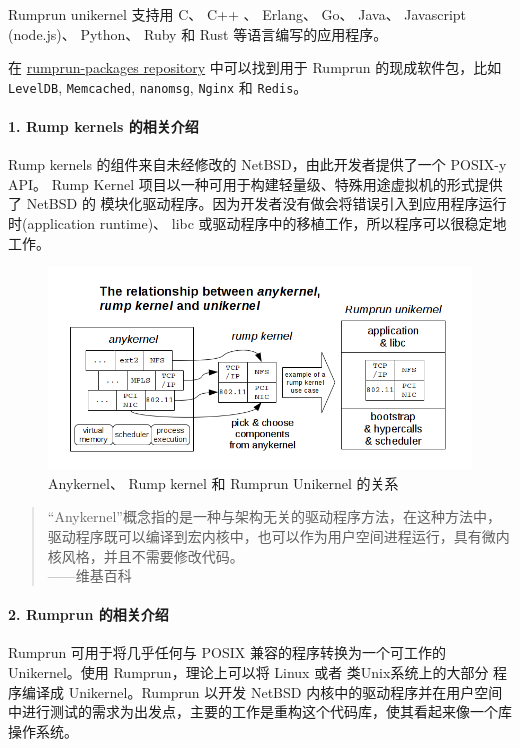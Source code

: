 \documentclass[UTF8,fontset=none,linespread=1.15]{ctexart}
\let\nosupcite\cite
\renewcommand*{\cite}[1]{\textsuperscript{\nosupcite{#1}}}
\begin{document}
Rumprun unikernel 支持用 C、 C++ 、 Erlang、 Go、
Java、 Javascript (node.js)、 Python、 Ruby 和 Rust 等语言编写的应用程序。

在 \href{https://github.com/rumpkernel/rumprun-packages}{rumprun-packages repository}
中可以找到用于 Rumprun 的现成软件包，比如 \texttt{LevelDB},
\texttt{Memcached}, \texttt{nanomsg}, \texttt{Nginx} 和 \texttt{Redis}。

\paragraph{1. Rump kernels 的相关介绍}\cite{bib:21-rump-kernel}\cite{bib:22-xen}

Rump kernels 的组件来自未经修改的 NetBSD，由此开发者提供了一个 POSIX-y API。
Rump Kernel 项目以一种可用于构建轻量级、特殊用途虚拟机的形式提供了 NetBSD 的
模块化驱动程序。因为开发者没有做会将错误引入到应用程序运行时(application runtime)、
libc 或驱动程序中的移植工作，所以程序可以很稳定地工作。
\begin{figure}[!hbt]
\includegraphics[width=\linewidth]{pictures/rumprun-1.png}
\caption{Anykernel、
Rump kernel 和 Rumprun Unikernel 的关系}
\end{figure}

\begin{quote}
“Anykernel”概念指的是一种与架构无关的驱动程序方法，在这种方法中，驱动程序既可以编译到宏内核中，也可以作为用户空间进程运行，具有微内核风格，并且不需要修改代码。\\
\hspace*{\fill}——维基百科
\end{quote}

\paragraph{2. Rumprun 的相关介绍}\cite{bib:23-mirageos}\cite{bib:24-rumrun}

Rumprun 可用于将几乎任何与 POSIX 兼容的程序转换为一个可工作的
Unikernel。使用 Rumprun，理论上可以将 Linux 或者 类Unix系统上的大部分
程序编译成 Unikernel。Rumprun 以开发 NetBSD 内核中的驱动程序并在用户空间
中进行测试的需求为出发点，主要的工作是重构这个代码库，使其看起来像一个库操作系统。
\end{document}
